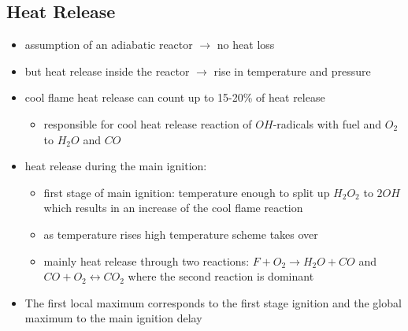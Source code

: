 \documentclass[12pt,oneside,a4paper,english]{article}
\begin{document}
\subsection{Heat Release} %
\label{heat_release}
\begin{itemize}
\item{assumption of an adiabatic reactor $\rightarrow$ no heat loss}
\item{but heat release inside the reactor $\rightarrow$ rise in temperature and pressure}
\item{cool flame heat release can count up to 15-20\% of heat release}

	\begin{itemize}
	\item{responsible for cool heat release reaction of $OH$-radicals with fuel and $O_2$ to $H_2O$ and $CO$}
	\end{itemize}
	
\item{heat release during the main ignition:}

	\begin{itemize}
	\item{first stage of main ignition: temperature enough to split up $H_2O_2$ to $2OH$ which results in an increase of the cool flame reaction}
	\item{as temperature rises high temperature scheme takes over}
	\item{mainly heat release through two reactions: $F+O_2 \rightarrow H_2O + CO$ and $CO + O_2 \leftrightarrow CO_2$ where the second reaction is dominant}
	\end{itemize}
	
\item{The first local maximum corresponds to the first stage ignition and the global maximum to the main ignition delay}
	
\end{itemize}
\end{document}
